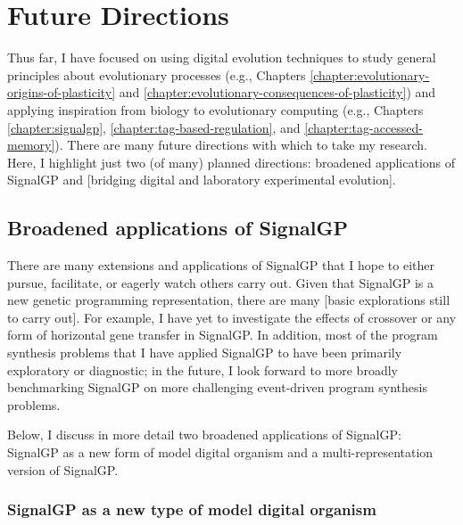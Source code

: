 \section{Future Directions}

Thus far, I have focused on using digital evolution techniques to study general principles about evolutionary processes (e.g., Chapters \ref{chapter:evolutionary-origins-of-plasticity} and \ref{chapter:evolutionary-consequences-of-plasticity}) and applying inspiration from biology to evolutionary computing (e.g., Chapters \ref{chapter:signalgp}, \ref{chapter:tag-based-regulation}, and \ref{chapter:tag-accessed-memory}).
There are many future directions with which to take my research.
Here, I highlight just two (of many) planned directions: broadened applications of SignalGP and [bridging digital and laboratory experimental evolution].


\subsection{Broadened applications of SignalGP}

There are many extensions and applications of SignalGP that I hope to either pursue, facilitate, or eagerly watch others carry out.
Given that SignalGP is a new genetic programming representation, there are many [basic explorations still to carry out].
For example, I have yet to investigate the effects of crossover or any form of horizontal gene transfer in SignalGP.
In addition, most of the program synthesis problems that I have applied SignalGP to have been primarily exploratory or diagnostic; in the future, I look forward to more broadly benchmarking SignalGP on more challenging event-driven program synthesis problems.  

Below, I discuss in more detail two broadened applications of SignalGP: SignalGP as a new form of model digital organism and a multi-representation version of SignalGP.

\subsubsection{SignalGP as a new type of model digital organism}

